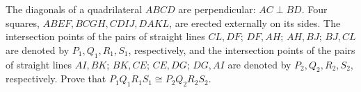 The diagonals of a quadrilateral $ABCD$ are perpendicular: $AC \perp BD$. Four squares, $ABEF, BCGH, CDIJ, DAKL$, are erected externally on its sides. The intersection points of the pairs of straight lines $CL, DF$; $DF, AH$; $AH, BJ$; $BJ, CL$ are denoted by $P_1, Q_1, R_1, S_1$, respectively, and the intersection points of the pairs of straight lines $AI, BK$; $BK, CE$; $CE, DG$; $DG, AI$ are denoted by $P_2, Q_2, R_2, S_2$, respectively. Prove that $P_1 Q_1 R_1 S_1 \cong P_2 Q_2 R_2 S_2$.
